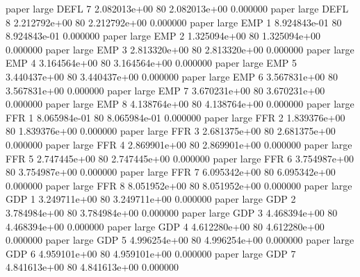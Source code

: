               paper      large     DEFL                 7 2.082013e+00 80   2.082013e+00           0.000000
              paper      large     DEFL                 8 2.212792e+00 80   2.212792e+00           0.000000
              paper      large      EMP                 1 8.924843e-01 80   8.924843e-01           0.000000
              paper      large      EMP                 2 1.325094e+00 80   1.325094e+00           0.000000
              paper      large      EMP                 3 2.813320e+00 80   2.813320e+00           0.000000
              paper      large      EMP                 4 3.164564e+00 80   3.164564e+00           0.000000
              paper      large      EMP                 5 3.440437e+00 80   3.440437e+00           0.000000
              paper      large      EMP                 6 3.567831e+00 80   3.567831e+00           0.000000
              paper      large      EMP                 7 3.670231e+00 80   3.670231e+00           0.000000
              paper      large      EMP                 8 4.138764e+00 80   4.138764e+00           0.000000
              paper      large      FFR                 1 8.065984e-01 80   8.065984e-01           0.000000
              paper      large      FFR                 2 1.839376e+00 80   1.839376e+00           0.000000
              paper      large      FFR                 3 2.681375e+00 80   2.681375e+00           0.000000
              paper      large      FFR                 4 2.869901e+00 80   2.869901e+00           0.000000
              paper      large      FFR                 5 2.747445e+00 80   2.747445e+00           0.000000
              paper      large      FFR                 6 3.754987e+00 80   3.754987e+00           0.000000
              paper      large      FFR                 7 6.095342e+00 80   6.095342e+00           0.000000
              paper      large      FFR                 8 8.051952e+00 80   8.051952e+00           0.000000
              paper      large      GDP                 1 3.249711e+00 80   3.249711e+00           0.000000
              paper      large      GDP                 2 3.784984e+00 80   3.784984e+00           0.000000
              paper      large      GDP                 3 4.468394e+00 80   4.468394e+00           0.000000
              paper      large      GDP                 4 4.612280e+00 80   4.612280e+00           0.000000
              paper      large      GDP                 5 4.996254e+00 80   4.996254e+00           0.000000
              paper      large      GDP                 6 4.959101e+00 80   4.959101e+00           0.000000
              paper      large      GDP                 7 4.841613e+00 80   4.841613e+00           0.000000
